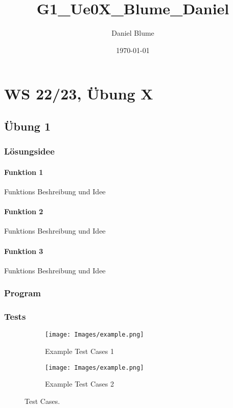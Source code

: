 \documentclass[12pt]{article}
\title{G1\_Ue0X\_Blume\_Daniel}
\date{\today}
\author{Daniel Blume}
\begin{document}
\maketitle


\clearpage


\section{WS 22/23, Übung X}

\subsection{Übung 1}

\subsubsection{Lösungsidee}

\paragraph{Funktion 1}
Funktions Beshreibung und Idee

\paragraph{Funktion 2}
Funktions Beshreibung und Idee

\paragraph{Funktion 3}
Funktions Beshreibung und Idee

\clearpage

\subsubsection{Program}
    
\clearpage

%     

\subsubsection{Tests}
    \begin{figure}[hp!]
      \centering
      \begin{subfigure}[b]{0.8\linewidth}
        \texttt{[image: Images/example.png]}
        \caption{Example Test Cases 1}
      \end{subfigure}
      \begin{subfigure}[b]{0.8\linewidth}
        \texttt{[image: Images/example.png]}
        \caption{Example Test Cases 2}
      \end{subfigure}
      \caption{Test Cases.}
      \label{fig:example}
    \end{figure}

\clearpage
\end{document}
